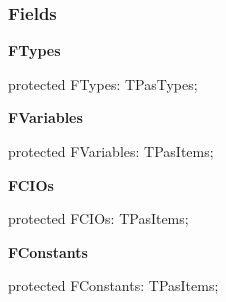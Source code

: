\documentclass{report}
\newif\ifpdf
\begin{document}
\subsubsection*{\large{\textbf{Fields}}\normalsize\hspace{1ex}\hfill}
\begin{list}{}{
\setlength{\itemindent}{0cm}
\setlength{\listparindent}{0cm}
\setlength{\leftmargin}{\evensidemargin}
\addtolength{\leftmargin}{\tmplength}
\settowidth{\labelsep}{X}
\addtolength{\leftmargin}{\labelsep}
\setlength{\labelwidth}{\tmplength}
}
\label{PasDoc_Items.TPasUnit-FTypes}
\item[\textbf{FTypes}\hfill]
\ifpdf
\begin{flushleft}
\fi
\begin{ttfamily}
protected FTypes: TPasTypes;\end{ttfamily}

\ifpdf
\end{flushleft}
\fi


\par  \label{PasDoc_Items.TPasUnit-FVariables}
\item[\textbf{FVariables}\hfill]
\ifpdf
\begin{flushleft}
\fi
\begin{ttfamily}
protected FVariables: TPasItems;\end{ttfamily}

\ifpdf
\end{flushleft}
\fi


\par  \label{PasDoc_Items.TPasUnit-FCIOs}
\item[\textbf{FCIOs}\hfill]
\ifpdf
\begin{flushleft}
\fi
\begin{ttfamily}
protected FCIOs: TPasItems;\end{ttfamily}

\ifpdf
\end{flushleft}
\fi


\par  \label{PasDoc_Items.TPasUnit-FConstants}
\item[\textbf{FConstants}\hfill]
\ifpdf
\begin{flushleft}
\fi
\begin{ttfamily}
protected FConstants: TPasItems;\end{ttfamily}

\ifpdf
\end{flushleft}
\fi



\end{list}
\end{document}
